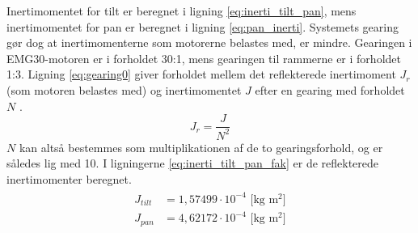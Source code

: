 Inertimomentet for tilt er beregnet i ligning \ref{eq:inerti_tilt_pan}, mens inertimomentet for pan er beregnet i ligning \ref{eq:pan_inerti}.
Systemets gearing gør dog at inertimomenterne som motorerne belastes med, er mindre.
Gearingen i EMG30-motoren er i forholdet 30:1, mens gearingen til rammerne er i forholdet 1:3.
Ligning \ref{eq:gearing0} giver forholdet mellem det reflekterede inertimoment \(J_r\) (som motoren belastes med)
og inertimomentet \(J\) efter en gearing med forholdet \(N\) \citep{gear_inerti}.
\begin{equation}
J_r=\frac{J}{N^2}
\label{eq:gearing0}
\end{equation}
\(N\) kan altså bestemmes som multiplikationen af de to gearingsforhold, og er således lig med 10.
I ligningerne \ref{eq:inerti_tilt_pan_fak} er de reflekterede inertimomenter beregnet.
\begin{align}
\label{eq:inerti_tilt_pan_fak}
\begin{split}
{J_{tilt}}&=1,57499\cdot{10}^{-4} \text{ [kg m$^2$]}
\\
{J_{pan}}&=4,62172\cdot{10}^{-4} \text{ [kg m$^2$]}
\end{split}
\end{align}
